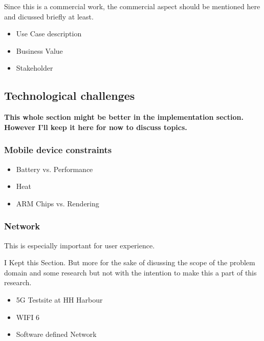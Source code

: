 \documentclass[titlepage, a4paper, 11pt]{scrartcl}
\begin{document}
            Since this is a commercial work, the commercial aspect should be mentioned here and dicussed briefly at least.

            \begin{itemize}
                \item Use Case description
                \item Business Value
                \item Stakeholder
            \end{itemize}
        
        
        \subsection{Technological challenges}

            \textbf{This whole section might be better in the implementation section. However I'll keep it here for now to discuss topics.}

            \subsubsection{Mobile device constraints}

                \begin{itemize}
                    \item Battery vs. Performance
                    \item Heat
                    \item ARM Chips vs. Rendering                    
                \end{itemize}

            \subsubsection{Network}

                This is especially important for user experience. 

                I Kept this Section. But more for the sake of disussing the scope of the problem domain and some research but not 
                with the intention to make this a part of this research.

                \begin{itemize}
                    \item 5G Testsite at HH Harbour
                    \item WIFI 6
                    \item Software defined Network
                \end{itemize}
\end{document}
